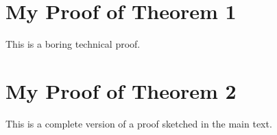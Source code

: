 \documentclass[anon,12pt]{colt2025} %
\begin{document}



\appendix


\section{My Proof of Theorem 1}

This is a boring technical proof.

\section{My Proof of Theorem 2}

This is a complete version of a proof sketched in the main text.
\end{document}
